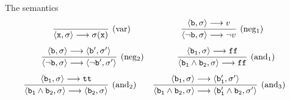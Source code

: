 \documentclass{beamer}
\begin{document}
\begin{frame}{The semantics}
        \[
                \infer[(\text{var})]{\langle \mathtt{x}, \sigma \rangle 
                \longrightarrow \sigma(\mathtt{x})}{} \qquad \qquad
                \qquad
                \infer[(\text{neg$_1$})]{\langle \neg \prog{b}, \sigma \rangle 
                \longrightarrow \neg v}{
                   \pv{\prog{b}}{\sigma} \longrightarrow
                   v
                }
        \] 
        \pause
        \vspace{0.2cm}        
        \[
                \infer[(\text{neg$_2$})]{
                \pv{\neg \prog{b}}{\sigma} 
                \longrightarrow \pv{\neg \prog{b'}}{\sigma'}
                }{
                \pv{\prog{b}}{\sigma} 
                \longrightarrow \pv{\prog{b'}}{\sigma'}
                } \qquad \qquad
                \infer[(\text{and$_1$})]{
                        \pv{\prog{b_1} \wedge \prog{b_2} }{\sigma}
                \longrightarrow \prog{ff}}{
                   \pv{\prog{b_1}}{\sigma} \longrightarrow
                   \prog{ff}
                }
        \] 
        \pause
        \vspace{0.2cm}
        \[
                \hspace{-0.3cm}
                \infer[(\text{and$_2$})]{
                \pv{ \prog{b_1} \wedge \prog{b_2} }{ \sigma }
                \longrightarrow 
                \pv{ \prog{b_2} }{\sigma}  }
                {
                   \pv{\prog{b_1}}{\sigma} \longrightarrow
                   \prog{tt}
                }
                \qquad 
                \infer[(\text{and$_3$})]{
                        \pv{\prog{b_1} \wedge \prog{b_2} }{\sigma}
                \longrightarrow \pv{\prog{b_1'} \wedge \prog{b_2}}{\sigma'} }{
                   \pv{\prog{b_1}}{\sigma} \longrightarrow
                   \pv{\prog{b_1'}}{\sigma'}
                }
        \] 
        \vfill
\end{frame}
\end{document}
